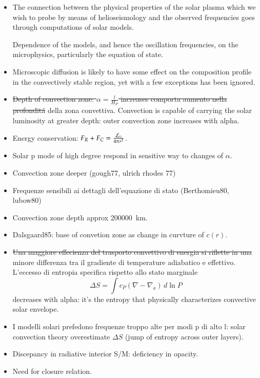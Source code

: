 \documentclass[oneside,12pt,fleqn]{memoir}
\begin{document}
{\begin{itemize}
\item The connection between the physical properties of the solar plasma which we wish to probe by means of helioseismology and the observed frequencies goes through computations of solar models.

Dependence of the models, and hence the oscillation frequencies, on the microphysics, particularly the equation of state.

\item Microscopic diffusion is likely to have some effect on the composition profile in the convectively stable region, yet with a few exceptions has been ignored.

\item \sout{Depth of convection zone: $\alpha=\frac{l}{H_P}$ increases comporta aumento nella profondit\'a} della zona convettiva. Convection is capable of carrying the solar luminosity at greater depth: outer convection zone increases with alpha.
\item Energy conservation: $F_R+F_C=\frac{\mathcal{L}_{\odot}{}}{4\pi r^2}$.
\item Solar p mode of high degree respond in sensitive way to changes of $\alpha$.

\item Convection zone deeper (gough77, ulrich rhodes 77)
\item Frequenze sensibili ai dettagli dell'equazione di stato (Berthomieu80, lubow80)
\item Convection zone depth approx \SI{200000}{\kilo\meter}.
\item Dalsgaard85: base of convetion zone as change in curvture of $c(r)$.
\item \sout{Una maggiore effecienza del trasporto convettivo di energia si riflette in una} minore differenza tra il gradiente di temperature adiabatico e effettivo. L'eccesso di entropia specifica rispetto allo stato marginale
\begin{equation}
    \Delta S=\int c_P(\nabla-\nabla_a)\,d\ln{P}
\end{equation}
decreases with alpha: it's the entropy that physically characterizes convective solar envelope.
\item I modelli solari prefedono frequenze troppo alte per modi p di alto l: solar convection theory overestimate $\Delta S$ (jump of entropy across outer layers).
\item Discepancy in radiative interior S/M: deficiency in opacity.
\item Need for closure relation.


\end{itemize}}
\end{document}
